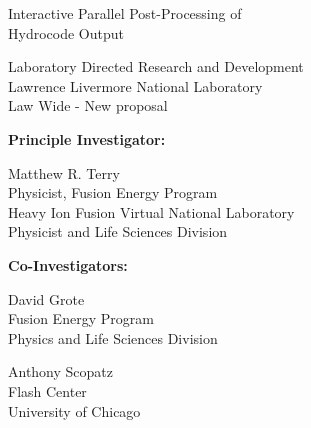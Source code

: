 \documentclass[letterpaper,12pt]{article}
\begin{document}
\begin{center}
	\LARGE
	\color{red}
	Interactive Parallel Post-Processing of \\ Hydrocode Output
\end{center}

\vspace{0.5in}

\setlength{\parindent}{0pt}
\large
Laboratory Directed Research and Development \\
Lawrence Livermore National Laboratory \\
Law Wide - New proposal

\normalsize
\begin{multicols}{2}
\textbf{Principle Investigator:}
\columnbreak

Matthew R. Terry \\
Physicist, Fusion Energy Program \\
Heavy Ion Fusion Virtual National Laboratory \\
Physicist and Life Sciences Division

\end{multicols}


\textbf{Co-Investigators:}
\begin{multicols}{2}
	David Grote \\
	Fusion Energy Program \\
	Physics and Life Sciences Division\\
	\columnbreak
			
	Anthony Scopatz \\
	Flash Center \\
	University of Chicago \\
\end{multicols}




\end{document}
